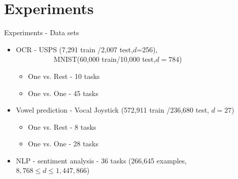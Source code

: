 \documentclass{beamer}
\begin{document}
\section{Experiments}

\begin{frame}{Experiments - Data sets}

\begin{itemize}
\item OCR - USPS \!(7,291 train /2,007 test,$d$=256),\\~~~~~~~~~~
 MNIST\!(60,000 train/10,000 test,$d=784$)  \newline
\begin{itemize}
\item One vs. Rest - 10 tasks\newline
\item One vs. One - 45 tasks \newline
\end{itemize}
\item Vowel prediction - Vocal Joystick (572,911 train /236,680 test, $d=27$)\newline
\begin{itemize}
\item One vs. Rest - 8 tasks\newline
\item One vs. One - 28 tasks \newline
\end{itemize}
\item NLP - sentiment analysis - 36 tasks (266,645 examples,\newline
~~ $8,768\le d\le 1,447,866$)\newline
\end{itemize}
\end{frame}
\end{document}
